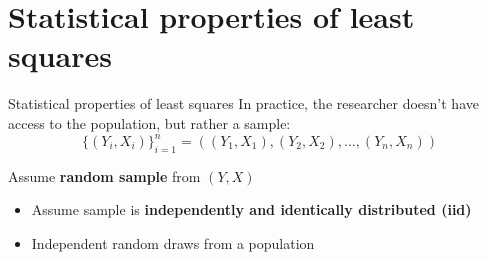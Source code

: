 \documentclass[compress, 8pt]{beamer}
\begin{document}




\section[Finite]{Statistical properties of least squares}
\miniframesoff
\begin{frame}
    \tableofcontents[currentsection]
\end{frame}
\miniframeson


\begin{frame}{Statistical properties of least squares}
    In practice, the researcher doesn't have access to the population, but rather a sample:
    \begin{equation*}
        \{ (Y_i, X_i) \}_{i=1}^n = ((Y_1, X_1), (Y_2, X_2), \dots, (Y_n, X_n))
    \end{equation*}

    Assume \textbf{random sample} from $(Y, X)$
    \begin{itemize}
        \item Assume sample is \textbf{independently and identically distributed (iid)}
        \item Independent random draws from a population
    \end{itemize}
\end{frame}
\end{document}
